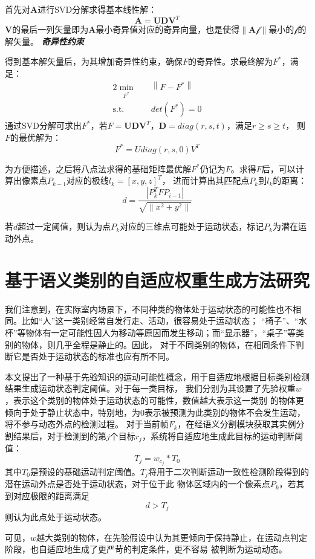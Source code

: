 首先对\textbf{A}进行SVD分解求得基本线性解：
$$\textbf{A}=\textbf{U}\textbf{D}\textbf{V}^{T}$$
$\textbf{V}$的最后一列矢量即为$\textbf{A}$最小奇异值对应的奇异向量，也是使得$\|\textbf{A}\mathcal{f}\|$最小的$\mathcal{f}$的解矢量。
\textbf{\emph{奇异性约束}}

得到基本解矢量后，为其增加奇异性约束，确保$F$的奇异性。求最终解为$F^{*}$，满足：
$$
\begin{aligned}{2}
    \min_{F^{*}} \quad & \left \|F-F^{*} \right \| \\
    \mbox{s.t.}\quad & det(F^{*})=0
\end{aligned}
$$
通过SVD分解可求出$F^{*}$，若$F=\textbf{U}\textbf{D}\textbf{V}^{T}$，$\textbf{D}=diag(r,s,t)$，满足$r\geq s \geq t$，
则$F$的最优解为：
$$F^{*}=Udiag(r,s,0)V^{T}$$

为方便描述，之后将八点法求得的基础矩阵最优解$F^{*}$仍记为$F$。求得$F$后，可以计算出像素点$P_{k-1}$对应的极线$l_{k}=\left[x,y,z\right]^{T}$，
进而计算出其匹配点$P_{k}$到$l_{k}$的距离：
$$
d=\frac{\left| P_{k}^{T}FP_{i-1} \right|}{\sqrt{\left \| x^{2}+y^{2}\right \|}}
$$

若$d$超过一定阈值，则认为点$P_{k}$对应的三维点可能处于运动状态，标记$P_{k}$为潜在运动外点。
\section{基于语义类别的自适应权重生成方法研究}
我们注意到，在实际室内场景下，不同种类的物体处于运动状态的可能性也不相同。比如“人”这一类别经常自发行走、活动，很容易处于运动状态；
“椅子”、“水杯”等物体有一定可能性因人为移动等原因而发生移动；而“显示器”，“桌子”等类别的物体，则几乎全程是静止的。因此，
对于不同类别的物体，在相同条件下判断它是否处于运动状态的标准也应有所不同。

本文提出了一种基于先验知识的运动可能性概念，用于自适应地根据目标类别检测结果生成运动状态判定阈值。对于每一类目标，
我们分别为其设置了先验权重$w$，表示这个类别的物体处于运动状态的可能性，数值越大表示这一类别
的物体更倾向于处于静止状态中，特别地，为0表示被预测为此类别的物体不会发生运动，将不参与动态外点的检测过程。
对于当前帧$F_{k}$，在经语义分割模块获取其实例分割结果后，对于检测到的第$j$个目标$r_{j}$，系统将自适应地生成此目标的运动判断阈值：
$$T_{j}=w_{c_{j}}*T_{0}$$
其中$T_{0}$是预设的基础运动判定阈值。$T_{j}$将用于二次判断运动一致性检测阶段得到的潜在运动外点是否处于运动状态，对于位于此
物体区域内的一个像素点$P_{k}$，若其到对应极限的距离满足
$$d>T_{j}$$
则认为此点处于运动状态。

可见，$w$越大类别的物体，在先验假设中认为其更倾向于保持静止，在运动点判定阶段，也自适应地生成了更严苛的判定条件，更不容易
被判断为运动动态。

